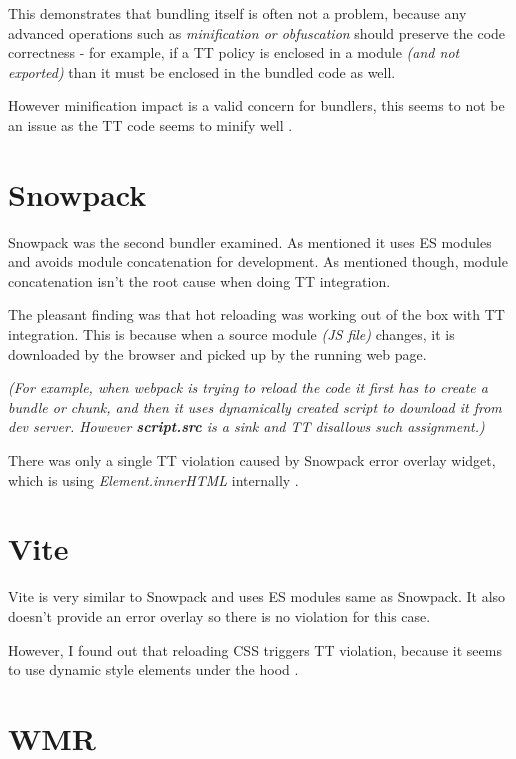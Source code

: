 This demonstrates that bundling itself is often not a problem, because any advanced operations such
as \emph{minification or obfuscation} should preserve the code correctness - for example, if a TT
policy is enclosed in a module \emph{(and not exported)} than it must be enclosed in the bundled
code as well.

However minification impact is a valid concern for bundlers, this seems to not be an issue as the TT
code seems to minify well \cite{tt_webpack_integration_minification}.

\section{Snowpack}

Snowpack was the second bundler examined. As mentioned it uses ES modules and avoids module
concatenation for development. As mentioned though, module concatenation isn't the root cause when
doing TT integration.

The pleasant finding was that hot reloading was working out of the box with TT integration. This is
because when a source module \emph{(JS file)} changes, it is downloaded by the browser and picked up
by the running web page.

\emph{(For example, when webpack is trying to reload the code it first has to create a bundle or
  chunk, and then it uses dynamically created script to download it from dev server. However
  \textbf{script.src} is a sink and TT disallows such assignment.)}

There was only a single TT violation caused by Snowpack error overlay widget, which is using
\emph{Element.innerHTML} internally \cite{snowpack_violation}.

\section{Vite}

Vite is very similar to Snowpack and uses ES modules same as Snowpack. It also doesn't provide an
error overlay so there is no violation for this case.

However, I found out that reloading CSS triggers TT violation, because it seems to use dynamic style
elements under the hood \cite{vite_violation}.

\section{WMR}

